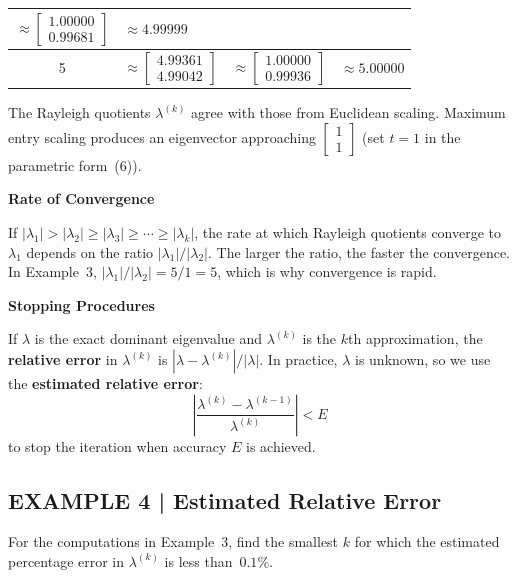 \documentclass{article}
\newcommand{\redheading}[1]{{\vspace{2mm}\noindent\Large\bfseries\color{red!55!black} #1\par}\vspace{2mm}}
\begin{document}
\begin{center}
\begin{tabular}{|c|l|l|l|}
$\approx\begin{bmatrix}1.00000\\0.99681\end{bmatrix}$ &
$\approx 4.99999$ \\
\hline
5 & $\approx\begin{bmatrix}4.99361\\4.99042\end{bmatrix}$ &
$\approx\begin{bmatrix}1.00000\\0.99936\end{bmatrix}$ &
$\approx 5.00000$ \\
\hline
\end{tabular}
\end{center}

The Rayleigh quotients $\lambda^{(k)}$ agree with those from Euclidean scaling.
Maximum entry scaling produces an eigenvector approaching $\begin{bmatrix}1\\1\end{bmatrix}$
(set $t=1$ in the parametric form~(6)).

\vspace{2mm}
\redheading{Rate of Convergence}

If $|\lambda_1|>|\lambda_2|\geq|\lambda_3|\geq\cdots\geq|\lambda_k|$, the rate at which
Rayleigh quotients converge to $\lambda_1$ depends on the ratio $|\lambda_1|/|\lambda_2|$.
The larger the ratio, the faster the convergence. In Example~3, $|\lambda_1|/|\lambda_2|=5/1=5$,
which is why convergence is rapid.

\vspace{2mm}
\redheading{Stopping Procedures}

If $\lambda$ is the exact dominant eigenvalue and $\lambda^{(k)}$ is the $k$th
approximation, the \textbf{relative error} in $\lambda^{(k)}$ is $|\lambda-\lambda^{(k)}|/|\lambda|$.
In practice, $\lambda$ is unknown, so we use the \textbf{estimated relative error}:
\begin{equation}
  \left|\frac{\lambda^{(k)}-\lambda^{(k-1)}}{\lambda^{(k)}}\right| < E \tag{13}
\end{equation}
to stop the iteration when accuracy $E$ is achieved.

\subsection*{EXAMPLE 4 | Estimated Relative Error}

For the computations in Example~3, find the smallest $k$ for which the estimated
percentage error in $\lambda^{(k)}$ is less than~$0.1\%$.
\end{document}
